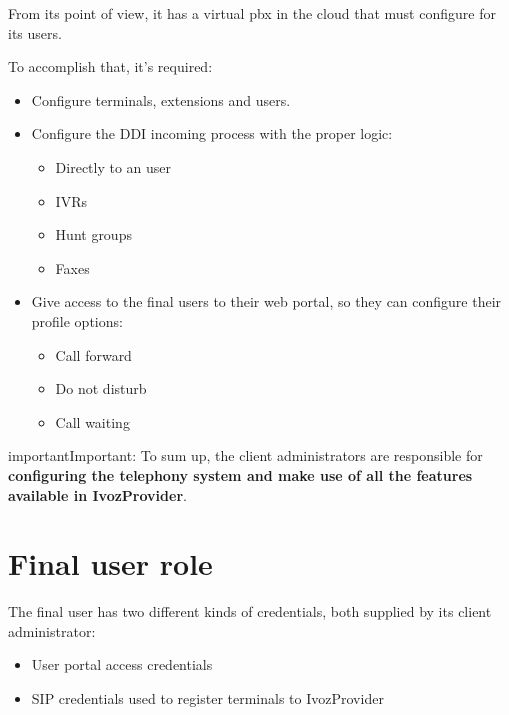 \documentclass[letterpaper,10pt,english]{sphinxmanual}
\begin{document}
From its point of view, it has a virtual pbx in the cloud that must
configure for its users.

To accomplish that, it's required:
\begin{itemize}
\item {} 
Configure terminals, extensions and users.

\item {} 
Configure the DDI incoming process with the proper logic:
\begin{itemize}
\item {} 
Directly to an user

\item {} 
IVRs

\item {} 
Hunt groups

\item {} 
Faxes

\end{itemize}

\item {} 
Give access to the final users to their web portal, so they can configure
their profile options:
\begin{itemize}
\item {} 
Call forward

\item {} 
Do not disturb

\item {} 
Call waiting

\end{itemize}

\end{itemize}

\begin{notice}{important}{Important:}
To sum up, the client administrators are responsible for
\textbf{configuring the telephony system and make use of all the
features available in IvozProvider}.
\end{notice}


\section{Final user role}
\label{basic_concepts/operation_roles/index:final-user-role}
The final user has two different kinds of credentials, both supplied by
its client administrator:
\begin{itemize}
\item {} 
User portal access credentials

\item {} 
SIP credentials used to register terminals to IvozProvider

\end{itemize}
\end{document}
